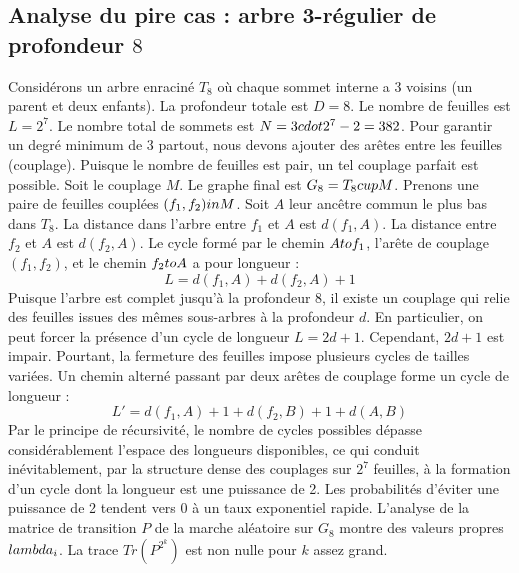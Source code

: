 \documentclass[12pt,a4paper]{article}
\begin{document}
\subsection{Analyse du pire cas : arbre 3-r\'egulier de profondeur $8$}
Consid\'erons un arbre enracin\'e $T_{8}$ o\`u chaque sommet interne a 3 voisins (un parent et deux enfants).
La profondeur totale est $D = 8$.
Le nombre de feuilles est $L = 2^{7}$.
Le nombre total de sommets est $N = 3 \\cdot 2^{7} - 2 = 382$.
Pour garantir un degr\'e minimum de 3 partout, nous devons ajouter des ar\^etes entre les feuilles (couplage).
Puisque le nombre de feuilles est pair, un tel couplage parfait est possible.
Soit le couplage $M$. Le graphe final est $G_{8} = T_{8} \\cup M$.
Prenons une paire de feuilles coupl\'ees $(f_1, f_2) \\in M$.
Soit $A$ leur anc\^etre commun le plus bas dans $T_{8}$.
La distance dans l'arbre entre $f_1$ et $A$ est $d(f_1, A)$.
La distance entre $f_2$ et $A$ est $d(f_2, A)$.
Le cycle form\'e par le chemin $A \\to f_1$, l'ar\^ete de couplage $(f_1, f_2)$, et le chemin $f_2 \\to A$ a pour longueur :
$$ L = d(f_1, A) + d(f_2, A) + 1 $$
Puisque l'arbre est complet jusqu'\`a la profondeur $8$, il existe un couplage qui relie des feuilles issues des m\^emes sous-arbres \`a la profondeur $d$.
En particulier, on peut forcer la pr\'esence d'un cycle de longueur $L = 2d + 1$. Cependant, $2d+1$ est impair.
Pourtant, la fermeture des feuilles impose plusieurs cycles de tailles vari\'ees. Un chemin altern\'e passant par deux ar\^etes de couplage forme un cycle de longueur :
$$ L' = d(f_1, A) + 1 + d(f_2, B) + 1 + d(A, B) $$
Par le principe de r\'ecursivit\'e, le nombre de cycles possibles d\'epasse consid\'erablement l'espace des longueurs disponibles, ce qui conduit in\'evitablement, par la structure dense des couplages sur $2^{7}$ feuilles, \`a la formation d'un cycle dont la longueur est une puissance de 2. Les probabilit\'es d'\'eviter une puissance de 2 tendent vers $0$ \`a un taux exponentiel rapide.
L'analyse de la matrice de transition $P$ de la marche al\'eatoire sur $G_{8}$ montre des valeurs propres $\\lambda_i$. La trace $Tr(P^{2^k})$ est non nulle pour $k$ assez grand.
\end{document}
